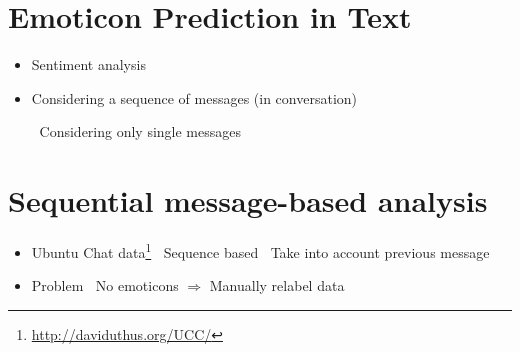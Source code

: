 \documentclass[
paper=128mm:96mm, %
fontsize=11pt, %
pagesize, %
parskip=half-, %
]{scrartcl} %
\newcommand{\red}[1]{\textit{\color{red}{#1}}}
\theoremstyle{mythmstyle} %
\begin{document}
\section{Emoticon Prediction in Text}


\begin{itemize}
\item Sentiment analysis

\item Considering a sequence of messages (in conversation)

\subitem \textbullet $\:$ Considering only single messages

\end{itemize}



\clearpage




\section{Sequential message-based analysis}

\begin{itemize}
\item Ubuntu Chat data\footnote{\url{http://daviduthus.org/UCC/}}
\subitem \textbullet $\:$ Sequence based
\subitem \textbullet $\:$ Take into account previous message

\item Problem
\subitem \textbullet $\:$ No emoticons $\Rightarrow$ Manually relabel data
\end{itemize}


\clearpage
\end{document}

